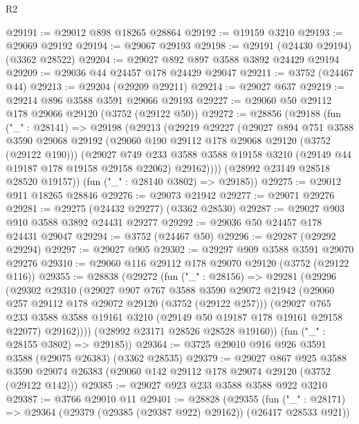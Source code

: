 \begin{lexlean}{R2}
\begin{coremodule}
@29191 := @29012 @898 @18265 @28864
@29192 := @19159 @3210
@29193 := @29069 @29192
@29194 := @29067 @29193
@29198 := @29191 (@24430 @29194) (@3362 @28522)
@29204 := @29027 @892 @897 @3588 @3892 @24429 @29194
@29209 := @29036 @44 @24457 @178 @24429 @29047
@29211 := @3752 (@24467 @44)
@29213 := @29204 (@29209 @29211)
@29214 := @29027 @637
@29219 := @29214 @896 @3588 @3591 @29066 @29193
@29227 := @29060 @50 @29112 @178 @29066 @29120 (@3752 (@29122 @50))
@29272 := @28856
    (@29188
      (fun ("_" : @28141) =>
      @29198
        (@29213
          (@29219
            @29227
            (@29027
              @894
              @751
              @3588
              @3590
              @29068
              @29192
              (@29060 @190 @29112 @178 @29068 @29120 (@3752 (@29122 @190)))
              (@29027
                @749
                @233
                @3588
                @3588
                @19158
                @3210
                (@29149 @44 @19187 @178 @19158 @29158 @22062)
                @29162))))
        (@28992 @23149 @28518 @28520 @19157))
      (fun ("_" : @28140 @3802) => @29185))
@29275 := @29012 @911 @18265 @28846
@29276 := @29073 @21942
@29277 := @29071 @29276
@29281 := @29275 (@24432 @29277) (@3362 @28530)
@29287 := @29027 @903 @910 @3588 @3892 @24431 @29277
@29292 := @29036 @50 @24457 @178 @24431 @29047
@29294 := @3752 (@24467 @50)
@29296 := @29287 (@29292 @29294)
@29297 := @29027 @905
@29302 := @29297 @909 @3588 @3591 @29070 @29276
@29310 := @29060 @116 @29112 @178 @29070 @29120 (@3752 (@29122 @116))
@29355 := @28838
    (@29272
      (fun ("_" : @28156) =>
      @29281
        (@29296
          (@29302
            @29310
            (@29027
              @907
              @767
              @3588
              @3590
              @29072
              @21942
              (@29060 @257 @29112 @178 @29072 @29120 (@3752 (@29122 @257)))
              (@29027
                @765
                @233
                @3588
                @3588
                @19161
                @3210
                (@29149 @50 @19187 @178 @19161 @29158 @22077)
                @29162))))
        (@28992 @23171 @28526 @28528 @19160))
      (fun ("_" : @28155 @3802) => @29185))
@29364 := @3725 @29010 @916 @926 @3591 @3588 (@29075 @26383) (@3362 @28535)
@29379 := @29027
    @867
    @925
    @3588
    @3590
    @29074
    @26383
    (@29060 @142 @29112 @178 @29074 @29120 (@3752 (@29122 @142)))
@29385 := @29027 @923 @233 @3588 @3588 @922 @3210
@29387 := @3766 @29010 @11
@29401 := @28828
    (@29355
      (fun ("_" : @28171) => @29364 (@29379 (@29385 (@29387 @922) @29162)) (@26417 @28533 @921))

\end{coremodule}
\end{lexlean}
